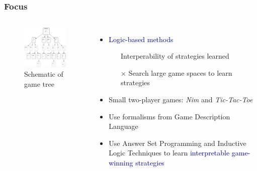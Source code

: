 \documentclass{beamer}
\newcommand\re[1]{\textcolor{darkblue}{#1}}
\begin{document}
\subsection{}
\begin{framefont}{\footnotesize}
  \begin{frame}
    \frametitle{Focus}
    \begin{columns}
      \begin{figure}
        \centering
        \includegraphics[trim={0cm -1cm 0cm 0cm},clip,width=5cm]{tree.png}
        \caption{Schematic of game tree}
      \end{figure}
      \begin{itemize}[<+->]
        \setlength\itemsep{1.2em}
      \item \re{Logic-based methods} 
      \begin{itemize}
        \item[\checkmark] Interperability of strategies learned
        \item[$\bm{\times}$] Search large game spaces to learn strategies
      \end{itemize}
      \item Small two-player games: \textit{Nim} and \textit{Tic-Tac-Toe}

      \item Use formalisms from Game Description Language
      \item Use Answer Set Programming and Inductive Logic Techniques to learn \re{interpretable game-winning strategies}
      \end{itemize}
    \end{columns}
  \end{frame}
\end{framefont}
\end{document}

